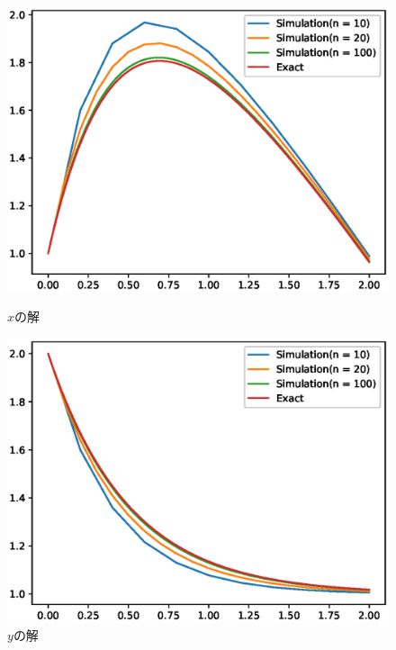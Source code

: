 \documentclass{jsarticle}
\begin{document}
        \begin{figure}[h]
            \begin{minipage}{0.5\hsize}
                \centering
                \includegraphics[width=1\hsize]{img/x.eps}
                \caption{$x$の解}
                \label{fig:simx}
            \end{minipage}
            \begin{minipage}{0.5\hsize}
                \centering
                \includegraphics[width=1\hsize]{img/y.eps}
                \caption{$y$の解}
                \label{fig:simy}
            \end{minipage}
        \end{figure}
\end{document}
